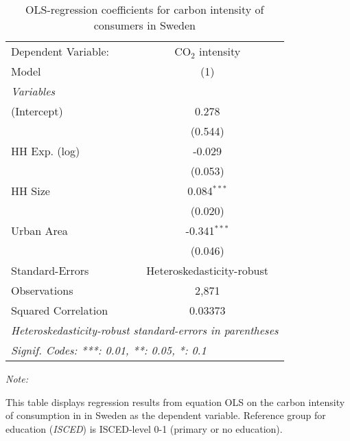 
\begin{table}[htbp!]
   \centering
   \small
   \begin{adjustbox}{width = 1\textwidth, max height = 0.95\textheight, center}
      \begin{threeparttable}[b]
         \caption{\label{tab:OLS_1_SWE} OLS-regression coefficients for carbon intensity of consumers in Sweden}
         \begin{tabular}{lc}
            \tabularnewline \midrule \midrule
            Dependent Variable: & CO$_{2}$ intensity\\  
            Model               & (1)\\  
            \midrule
            \emph{Variables}\\
            (Intercept)         & 0.278\\   
                                & (0.544)\\   
            HH Exp. (log)       & -0.029\\   
                                & (0.053)\\   
            HH Size             & 0.084$^{***}$\\   
                                & (0.020)\\   
            Urban Area          & -0.341$^{***}$\\   
                                & (0.046)\\   
            \midrule 
            Standard-Errors     & Heteroskedasticity-robust \\   
            Observations        & 2,871\\  
            Squared Correlation & 0.03373\\  
            \midrule \midrule
            \multicolumn{2}{l}{\emph{Heteroskedasticity-robust standard-errors in parentheses}}\\
            \multicolumn{2}{l}{\emph{Signif. Codes: ***: 0.01, **: 0.05, *: 0.1}}\\
         \end{tabular}
         
         \begin{tablenotes}\item \medskip \textit{Note:}
            \item This table displays regression results from equation OLS on the carbon intensity of consumption in  in Sweden as the dependent variable. Reference group for education (\textit{ISCED}) is ISCED-level 0-1 (primary or no education).
         \end{tablenotes}
      \end{threeparttable}
   \end{adjustbox}
\end{table}


